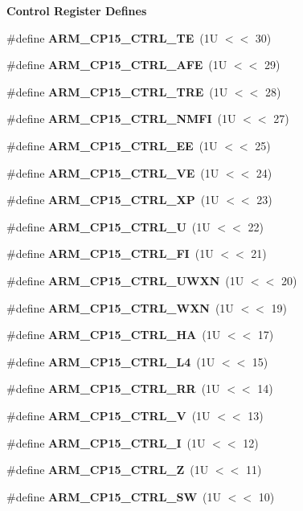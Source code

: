 \begin{Indent}\textbf{ Control Register Defines}\par
\begin{DoxyCompactItemize}
\item 
\#define {\bfseries A\+R\+M\+\_\+\+C\+P15\+\_\+\+C\+T\+R\+L\+\_\+\+TE}~(1\+U $<$$<$ 30)
\item 
\#define {\bfseries A\+R\+M\+\_\+\+C\+P15\+\_\+\+C\+T\+R\+L\+\_\+\+A\+FE}~(1\+U $<$$<$ 29)
\item 
\#define {\bfseries A\+R\+M\+\_\+\+C\+P15\+\_\+\+C\+T\+R\+L\+\_\+\+T\+RE}~(1\+U $<$$<$ 28)
\item 
\#define {\bfseries A\+R\+M\+\_\+\+C\+P15\+\_\+\+C\+T\+R\+L\+\_\+\+N\+M\+FI}~(1\+U $<$$<$ 27)
\item 
\#define {\bfseries A\+R\+M\+\_\+\+C\+P15\+\_\+\+C\+T\+R\+L\+\_\+\+EE}~(1\+U $<$$<$ 25)
\item 
\#define {\bfseries A\+R\+M\+\_\+\+C\+P15\+\_\+\+C\+T\+R\+L\+\_\+\+VE}~(1\+U $<$$<$ 24)
\item 
\#define {\bfseries A\+R\+M\+\_\+\+C\+P15\+\_\+\+C\+T\+R\+L\+\_\+\+XP}~(1\+U $<$$<$ 23)
\item 
\#define {\bfseries A\+R\+M\+\_\+\+C\+P15\+\_\+\+C\+T\+R\+L\+\_\+U}~(1\+U $<$$<$ 22)
\item 
\#define {\bfseries A\+R\+M\+\_\+\+C\+P15\+\_\+\+C\+T\+R\+L\+\_\+\+FI}~(1\+U $<$$<$ 21)
\item 
\#define {\bfseries A\+R\+M\+\_\+\+C\+P15\+\_\+\+C\+T\+R\+L\+\_\+\+U\+W\+XN}~(1\+U $<$$<$ 20)
\item 
\#define {\bfseries A\+R\+M\+\_\+\+C\+P15\+\_\+\+C\+T\+R\+L\+\_\+\+W\+XN}~(1\+U $<$$<$ 19)
\item 
\#define {\bfseries A\+R\+M\+\_\+\+C\+P15\+\_\+\+C\+T\+R\+L\+\_\+\+HA}~(1\+U $<$$<$ 17)
\item 
\#define {\bfseries A\+R\+M\+\_\+\+C\+P15\+\_\+\+C\+T\+R\+L\+\_\+\+L4}~(1\+U $<$$<$ 15)
\item 
\#define {\bfseries A\+R\+M\+\_\+\+C\+P15\+\_\+\+C\+T\+R\+L\+\_\+\+RR}~(1\+U $<$$<$ 14)
\item 
\#define {\bfseries A\+R\+M\+\_\+\+C\+P15\+\_\+\+C\+T\+R\+L\+\_\+V}~(1\+U $<$$<$ 13)
\item 
\#define {\bfseries A\+R\+M\+\_\+\+C\+P15\+\_\+\+C\+T\+R\+L\+\_\+I}~(1\+U $<$$<$ 12)
\item 
\#define {\bfseries A\+R\+M\+\_\+\+C\+P15\+\_\+\+C\+T\+R\+L\+\_\+Z}~(1\+U $<$$<$ 11)
\item 
\#define {\bfseries A\+R\+M\+\_\+\+C\+P15\+\_\+\+C\+T\+R\+L\+\_\+\+SW}~(1\+U $<$$<$ 10)

\end{DoxyCompactItemize}
\end{Indent}
